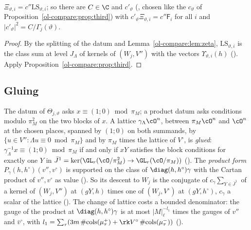 \begin{corollary}
\label{ol-compare:cor:twistfactor}
$\Xi_{\vartheta,i}=c''\mathrm{LS}_{\vartheta,i}$; so there are $C\in\C$ and $c'_\vartheta$ (, chosen like the
$c_\vartheta$ of Proposition~\ref{ol-compare:prop:third}) with $c'_\vartheta\Xi_{\vartheta,i}=c''\mathsf F_i$ for all $i$ and $|c'_\vartheta|^2=C/\Gamma_j(\vartheta)$.
\end{corollary}

\begin{proof}
By the splitting of the datum and Lemma~\ref{ol-compare:lem:zeta}, $\mathrm{LS}_{\vartheta,i}$ is the class sum
at level $J_\Lambda$ of kernels of $(W_j,V'')$ with the vectors $\Upsilon_{\vartheta,i}(h)$
(). Apply Proposition~\ref{ol-compare:prop:third}.
\end{proof}

\subsection{Gluing}\label{ol-compare:sec:gluing}

The datum of $\Theta_{j,\vartheta}$ asks $x\equiv(1;0)\bmod\pi_M$; a product datum asks conditions modulo
$\pi_M^2$ on the two blocks of $x$. A lattice $\gamma_\Lambda\cO^n$, between $\pi_M\cO^n$ and $\cO^n$
at the chosen places, spanned by $(1;0)$ on both summands, by $\{u\in V'':\Lambda u\equiv0\bmod\pi_M\}$
and by $\pi_M$ times the lattice of $V^\circ$, is \emph{glued}: $\gamma_\Lambda^{-1}x\equiv(1;0)\bmod\pi_M$ if
and only if $xY$ satisfies the block conditions for exactly one $Y$ in
$\bar J^1=\ker(\GL_r(\cO/\pi_M^2)\to\GL_r(\cO/\pi_M))$ ().
The \emph{product form} $P_\gamma(h,h^\circ)(v'',v^\circ)$ is supported on the class of $\diag(h,h^\circ)\gamma$
with the Cartan product of $v'',v^\circ$ as value (). So its
descent to $W_j$ is the conjugate of $c_\gamma\sum_{Y\in\bar J^1}$ of a kernel of $(W_j,V'')$ at
$(gY,h)$ times one of $(W_j,V^\circ)$ at $(gY,h^\circ)$, $c_\gamma$ a scalar of the lattice
(). The change of lattice costs a
bounded denominator: the gauge of the product at $\diag(h,h^\circ)\gamma$ is at most $|M|_\ell^{-l_1}$
times the gauges of $v''$ and $\bar v^\circ$, with
$l_1=\sum_\tau(3m\,\#\mathrm{cols}(\mu^+_\tau)+\rk V^\circ\,\#\mathrm{cols}(\mu^-_\tau))$
().

